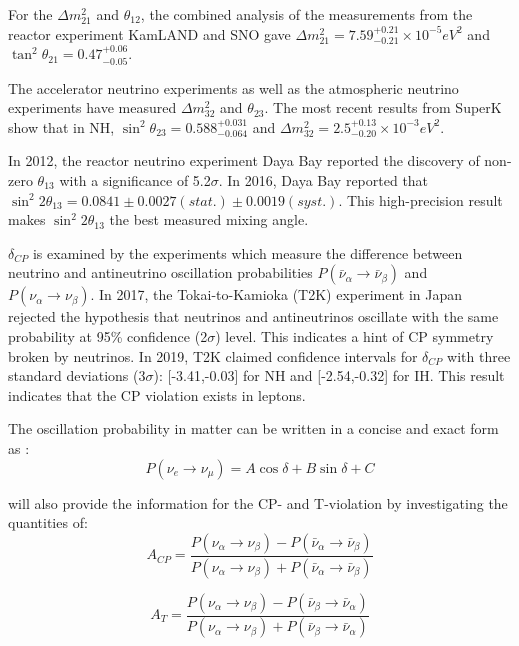 For the $\Delta m^2_{21}$ and $\theta_{12}$, the combined analysis of the measurements from the reactor experiment KamLAND and SNO gave $\Delta m^2_{21} = 7.59^{+0.21}_{-0.21}\times 10^{-5}eV^2$ and $\tan^2{\theta}_{21}=0.47^{+0.06}_{-0.05}$\cite{abe2008precision}.

The accelerator neutrino experiments as well as the atmospheric neutrino experiments have measured $\Delta m^2_{32}$ and $\theta_{23}$. The most recent results from SuperK show that in NH, $\sin^2\theta_{23}=0.588^{+0.031}_{-0.064}$ and $\Delta m^2_{32} = 2.5^{+0.13}_{-0.20}\times 10^{-3} eV^2$\cite{abe2018atmospheric}. 

In 2012, the reactor neutrino experiment Daya Bay reported the discovery of non-zero $\theta_{13}$ with a significance of 5.2$\sigma$. In 2016, Daya Bay reported that $\sin^2 2\theta_{13} = 0.0841\pm0.0027(stat.)\pm0.0019(syst.)$. This high-precision result makes $\sin^2 2\theta_{13}$ the best measured mixing angle\cite{an2017measurement,qian2019physics}.

$\delta_{CP}$ is examined by the experiments which measure the difference between neutrino and antineutrino oscillation probabilities $P(\bar{\nu}_\alpha\to\bar{\nu}_\beta)$ and $P(\nu_\alpha\to\nu_\beta)$\cite{xing}. In 2017, the Tokai-to-Kamioka (T2K) experiment in Japan rejected the hypothesis that neutrinos and antineutrinos oscillate with the same probability at 95\% confidence (2$\sigma$) level. This indicates a hint of CP symmetry broken by neutrinos\cite{abe2017measurement}. In 2019, T2K  claimed confidence intervals for $\delta_{CP}$ with three standard deviations ($3\sigma$): [-3.41,-0.03] for NH and [-2.54,-0.32] for IH. This result indicates that the CP violation exists in leptons\cite{abe2019constraint}.


The oscillation probability in matter can be written in a concise and exact form as \cite{kimura2002exact}:
\[
P(\nu_e\to\nu_\mu) = A\cos\delta+B\sin\delta+C
\]



will also provide the information for the CP- and T-violation
by investigating the quantities of:
\[
A_{CP} = \frac{P(\nu_\alpha\to\nu_\beta)-P(\bar{\nu}_\alpha\to\bar{\nu}_\beta)}{P(\nu_\alpha\to\nu_\beta)+P(\bar{\nu}_\alpha\to\bar{\nu}_\beta)}
\]

\[
A_T = \frac{P(\nu_\alpha\to\nu_\beta)-P(\bar{\nu}_\beta\to\bar{\nu}_\alpha)}{P(\nu_\alpha\to\nu_\beta)+P(\bar{\nu}_\beta\to\bar{\nu}_\alpha)}
\]

%



